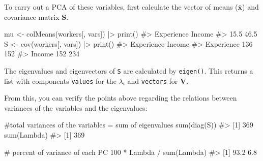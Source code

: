 \documentclass[
  letterpaper,
  10pt,
  krantz2]{krantz}
\makeatletter
\newenvironment{Shaded}{\begin{snugshade}}{\end{snugshade}}
\newcommand{\CommentTok}[1]{\textcolor[rgb]{0.37,0.37,0.37}{#1}}
\newcommand{\DecValTok}[1]{\textcolor[rgb]{0.68,0.00,0.00}{#1}}
\newcommand{\FunctionTok}[1]{\textcolor[rgb]{0.28,0.35,0.67}{#1}}
\newcommand{\NormalTok}[1]{\textcolor[rgb]{0.00,0.23,0.31}{#1}}
\newcommand{\OtherTok}[1]{\textcolor[rgb]{0.00,0.23,0.31}{#1}}
\newcommand{\SpecialCharTok}[1]{\textcolor[rgb]{0.37,0.37,0.37}{#1}}
\newenvironment{kframe}{%
  \medskip{}
  \setlength{\fboxsep}{.8em}
  \def\at@end@of@kframe{}%
  \ifinner\ifhmode%
  \def\at@end@of@kframe{\end{minipage}}%
  \begin{minipage}{\columnwidth}%
  \fi\fi%
  \def\FrameCommand##1{\hskip\@totalleftmargin \hskip-\fboxsep
  \colorbox{shadecolor}{##1}\hskip-\fboxsep
      \hskip-\linewidth \hskip-\@totalleftmargin \hskip\columnwidth}%
  \MakeFramed {\advance\hsize-\width
    \@totalleftmargin\z@ \linewidth\hsize
    \@setminipage}}%
{\par\unskip\endMakeFramed%
  \at@end@of@kframe}
\renewenvironment{Shaded}{\begin{kframe}}{\end{kframe}}
\makeatother
\begin{document}
To carry out a PCA of these variables, first calculate the vector of
means (\(\bar{\mathbf{x}}\)) and covariance matrix \(\mathbf{S}\).

\begin{Shaded}
\begin{Highlighting}[]
\NormalTok{mu }\OtherTok{\textless{}{-}} \FunctionTok{colMeans}\NormalTok{(workers[, vars]) }\SpecialCharTok{|\textgreater{}} \FunctionTok{print}\NormalTok{()}
\CommentTok{\#\textgreater{} Experience     Income }
\CommentTok{\#\textgreater{}       15.5       46.5}
\NormalTok{S }\OtherTok{\textless{}{-}} \FunctionTok{cov}\NormalTok{(workers[, vars]) }\SpecialCharTok{|\textgreater{}} \FunctionTok{print}\NormalTok{()}
\CommentTok{\#\textgreater{}            Experience Income}
\CommentTok{\#\textgreater{} Experience        136    152}
\CommentTok{\#\textgreater{} Income            152    234}
\end{Highlighting}
\end{Shaded}

The eigenvalues and eigenvectors of \texttt{S} are calculated by
\texttt{eigen()}. This returns a list with components \texttt{values}
for the \(\lambda_i\) and \texttt{vectors} for \(\mathbf{V}\).

\begin{Shaded}
\end{Shaded}

From this, you can verify the points above regarding the relations
between variances of the variables and the eigenvalues:

\begin{Shaded}
\begin{Highlighting}[]
\CommentTok{\#total variances of the variables = sum of eigenvalues}
\FunctionTok{sum}\NormalTok{(}\FunctionTok{diag}\NormalTok{(S))}
\CommentTok{\#\textgreater{} [1] 369}
\FunctionTok{sum}\NormalTok{(Lambda)}
\CommentTok{\#\textgreater{} [1] 369}

\CommentTok{\# percent of variance of each PC}
\DecValTok{100} \SpecialCharTok{*}\NormalTok{ Lambda }\SpecialCharTok{/} \FunctionTok{sum}\NormalTok{(Lambda)}
\CommentTok{\#\textgreater{} [1] 93.2  6.8}
\end{Highlighting}
\end{Shaded}
\end{document}
